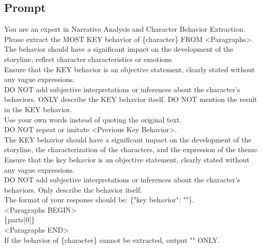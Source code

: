 \subsection{Prompt}
\label{sec:app_prompt}

\begin{tcolorbox}[title = {First Behavior Generation Prompt}, breakable]

You are an expert in Narrative Analysis and Character Behavior Extraction.\\
Please extract the MOST KEY behavior of \{character\} FROM <Paragraphs>.\\
The behavior should have a significant impact on the development of the storyline, reflect character characteristics or emotions.\\

Ensure that the KEY behavior is an objective statement, clearly stated without any vague expressions.\\
DO NOT add subjective interpretations or inferences about the character's behaviors. ONLY describe the KEY behavior itself. DO NOT mention the result in the KEY behavior.\\
Use your own words instead of quoting the original text.\\
DO NOT repeat or imitate <Previous Key Behavior>.\\

The KEY behavior should have a significant impact on the development of the storyline, the characterization of the characters, and the expression of the theme.\\
Ensure that the key behavior is an objective statement, clearly stated without any vague expressions.\\
DO NOT add subjective interpretations or inferences about the character's behaviors. Only describe the behavior itself.\\

The format of your response should be: \{"key behavior": ""\}.\\

<Paragraphs BEGIN>\\
\{parts[0]\}\\
<Paragraphs END>\\

If the behavior of \{character\} cannot be extracted, output "" ONLY.


\end{tcolorbox}



